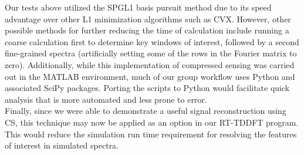 \documentclass[11pt]{article}
\begin{document}
Our tests above utilized the SPGL1 basis pursuit method due to its speed advantage over other L1 minimization algorithms such as CVX. However, other possible methods for further reducing the time of calculation include running a coarse calculation first to determine key windows of interest, followed by a second fine-grained spectra (artificially setting some of the rows in the Fourier matrix to zero). Additionally, while this implementation of compressed sensing was carried out in the MATLAB environment, much of our group workflow uses Python and associated SciPy packages. Porting the scripts to Python would facilitate quick analysis that is more automated and less prone to error.\\

Finally, since we were able to demonstrate a useful signal reconstruction using CS, this technique may now be applied as an option in our RT-TDDFT program.  This would reduce the simulation run time requirement for resolving the features of interest in simulated spectra.\\ 

\pagebreak

\end{document}
